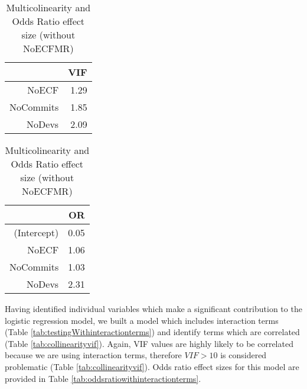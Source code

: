 \documentclass[times]{smrauth}
\begin{document}
\begin{table}[tbp]
\centering
\caption{Multicolinearity and Odds Ratio effect size (without NoECFMR)} 
\label{tab:multicolinearitywithoutsum}
\begin{tabular}{rr}
  \hline
 & VIF \\ 
  \hline
NoECF & 1.29 \\ 
  NoCommits & 1.85 \\ 
  NoDevs & 2.09 \\ 
   \hline
\end{tabular}
\quad
\quad
\quad
\begin{tabular}{rr}
  \hline
 & OR \\ 
  \hline
(Intercept) & 0.05 \\ 
  NoECF & 1.06 \\ 
  NoCommits & 1.03 \\ 
  NoDevs & 2.31 \\ 
   \hline
\end{tabular}
\end{table}





Having identified individual variables which make a significant contribution to the logistic regression model, we built a model which includes interaction terms (Table \ref{tab:testingWithinteractionterms}) and identify terms which are correlated (Table \ref{tab:collinearityvif}). Again, VIF values are highly likely to be correlated because we are using interaction terms, therefore $VIF > 10$ is considered problematic (Table \ref{tab:collinearityvif}). Odds ratio effect sizes for this model are provided in Table \ref{tab:oddsratiowithinteractionterms}.
\end{document}
